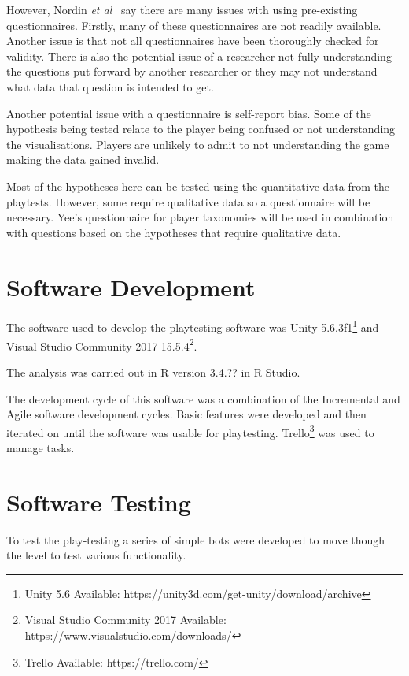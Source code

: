 \documentclass[journal]{IEEEtran}
\begin{document}
However, Nordin \textit{et al}~\cite{nordin2014} say there are many issues with using pre-existing questionnaires. Firstly, many of these questionnaires are not readily available. Another issue is that not all questionnaires have been thoroughly checked for validity. There is also the potential issue of a researcher not fully understanding the questions put forward by another researcher or they may not understand what data that question is intended to get.

Another potential issue with a questionnaire is self-report bias. Some of the hypothesis being tested relate to the player being confused or not understanding the visualisations. Players are unlikely to admit to not understanding the game making the data gained invalid. 

Most of the hypotheses here can be tested using the quantitative data from the playtests. However, some require qualitative data so a questionnaire will be necessary. 
Yee's questionnaire for player taxonomies will be used in combination with questions based on the hypotheses that require qualitative data.


\section{Software Development} \label{softdev}
The software used to develop the playtesting software was Unity 5.6.3f1\footnote[3]{Unity 5.6 Available: https://unity3d.com/get-unity/download/archive} and Visual Studio Community 2017  15.5.4\footnote[4]{Visual Studio Community 2017 Available: https://www.visualstudio.com/downloads/}.

The analysis was carried out in R version 3.4.?? in R Studio.

The development cycle of this software was a combination of the Incremental and Agile software development cycles. Basic features were developed and then iterated on until the software was usable for playtesting. Trello\footnote[5]{Trello Available: https://trello.com/} was used to manage tasks.

\section{Software Testing} \label{softtest}
To test the play-testing a series of simple bots were developed to move though the level to test various functionality.
\end{document}
